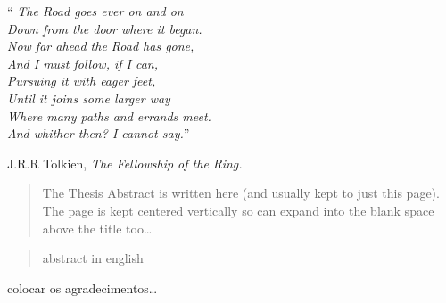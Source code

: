 \documentclass[
12pt, %
oneside, %
english, brazil, %
doublespacing,
nolistspacing, %
liststotoc, %
]{MastersDoctoralThesis} %
\begin{document}
\vspace*{0.2\textheight}
\begin{center}
\noindent\enquote{\itshape
    The Road goes ever on and on \\ 
    		Down from the door where it began. \\
    Now far ahead the Road has gone, \\
    		And I must follow, if I can, \\
    Pursuing it with eager feet, \\
    		Until it joins some larger way \\
    Where many paths and errands meet. \\
    		And whither then? I cannot say.}\bigbreak

 J.R.R Tolkien, \textit{The Fellowship of the Ring.}
\end{center}
\cleardoublepage

\begin{abstract}
\addchaptertocentry{\abstractname} %

The Thesis Abstract is written here (and usually kept to just this page). The page is kept centered vertically so can expand into the blank space above the title too\ldots

\end{abstract}

\begin{abstract}
\addchaptertocentry{\abstractname}
abstract in english
\end{abstract}


\begin{acknowledgements}
\addchaptertocentry{\acknowledgementname} %

colocar os agradecimentos\ldots

\end{acknowledgements}

\end{document}
